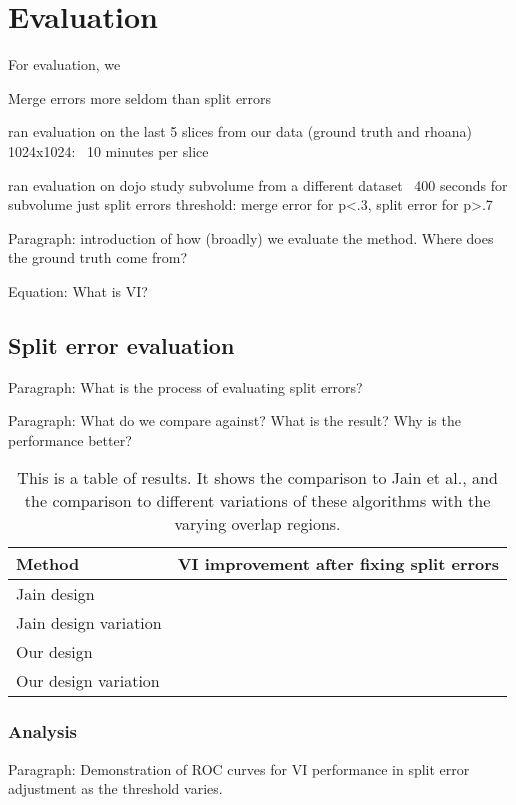 \section{Evaluation}

For evaluation, we 

Merge errors more seldom than split errors

ran evaluation on the last 5 slices from our data (ground truth and rhoana)
1024x1024: ~10 minutes per slice

ran evaluation on dojo study subvolume from a different dataset
~400 seconds for subvolume just split errors
threshold: merge error for p<.3, split error for p>.7




Paragraph: introduction of how (broadly) we evaluate the method. Where does the ground truth come from?

Equation: What is VI?

\subsection{Split error evaluation}

Paragraph: What is the process of evaluating split errors?

Paragraph: What do we compare against? What is the result? Why is the performance better?

\begin{table}[t]
\begin{tabular}{ll}
\toprule
Method & VI improvement after fixing split errors \\
\midrule
Jain design & \\
Jain design variation & \\
Our design &  \\
Our design variation & \\
\bottomrule
\end{tabular}
\caption{This is a table of results. It shows the comparison to Jain et al., and the comparison to different variations of these algorithms with the varying overlap regions.}
\label{tab:spliterrorcorrectionperformance}
\end{table}

\subsubsection{Analysis}

Paragraph: Demonstration of ROC curves for VI performance in split error adjustment as the threshold varies.

